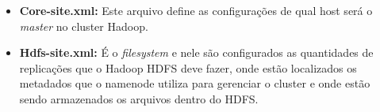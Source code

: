\begin{itemize}

\item \textbf{Core-site.xml:} Este arquivo define as configurações de qual host será o \textit{master} no cluster Hadoop.

\item \textbf{Hdfs-site.xml:} É o \textit{filesystem} e nele são configurados as quantidades de replicações que o Hadoop HDFS deve fazer, onde estão localizados os metadados que o namenode utiliza para gerenciar o cluster e onde estão sendo armazenados os arquivos dentro do HDFS.

\end{itemize}
